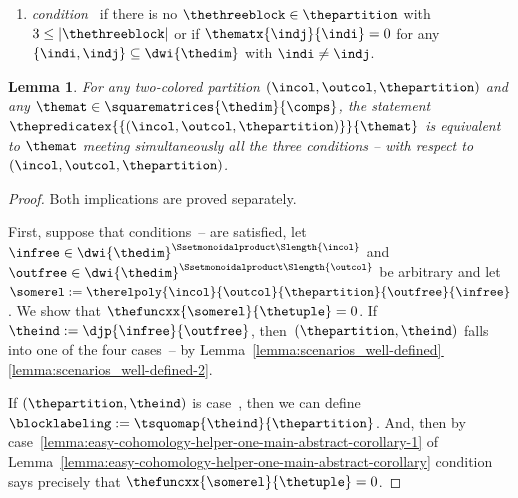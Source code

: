 \documentclass[pdftex]{sigma}
\numberwithin{equation}{section}
\newtheorem{Lemma}[Theorem]{Lemma}
\begin{document}
{\begin{Definition}
\begin{enumerate}
        \item \emph{condition~\conditionthree{}} if there is no $\thethreeblock\in\thepartition$ with $3\leq|\thethreeblock|$ or if $\thematx{\indj}{\indi}=0$ for any $\{\indi,\indj\}\subseteq \dwi{\thedim}$ with $\indi\neq \indj$.
    \end{enumerate}
  \end{Definition}
  \begin{Lemma}
    \label{lemma:scalar-article-main-lemma-corollary}
    For any two-colored partition $(\incol,\outcol,\thepartition)$  and any   $\themat\in\squarematrices{\thedim}{\comps}$, the statement    \linebreak $\thepredicatex{\{(\incol,\outcol,\thepartition)\}}{\themat}$ is equivalent to  $\themat$ meeting simultaneously all the three conditions \conditionone{}--\conditionthree{}  with respect to $(\incol,\outcol,\thepartition)$.
  \end{Lemma}

  \begin{proof}
    \newcommand{\thepoint}{\Yp{z}}
  \newcommand{\anypoint}{\Yp{y}}
  \newcommand{\thevalue}{s}
  \newcommand{\firstspecialpoint}{\Yp{z}_1}
  \newcommand{\secondspecialpoint}{\Yp{z}_2}
  Both implications are proved separately.

   First, suppose that  conditions~\conditionone{}--\conditionthree{} are satisfied, let  $\infree\in \dwi{\thedim}^{\Ssetmonoidalproduct\Slength{\incol}}$ and $\outfree\in\dwi{\thedim}^{\Ssetmonoidalproduct\Slength{\outcol}}$ be arbitrary and let $\somerel:= \therelpoly{\incol}{\outcol}{\thepartition}{\outfree}{\infree}$. We show that $\thefuncxx{\somerel}{\thetuple}=0$. If $\theind:=\djp{\infree}{\outfree}$, then~${(\thepartition,\theind)}$ falls into one of the four cases~\scenarioone{}--\scenariofour{} by Lem\-ma~\hyperref[lemma:scenarios_well-defined-2]{\ref*{lemma:scenarios_well-defined}\,\ref*{lemma:scenarios_well-defined-2}}.

If $(\thepartition,\theind)$ is case~\scenarioone{}, then we can define $\blocklabeling:=\tsquomap{\theind}{\thepartition}$. And,  then  by case~\ref{lemma:easy-cohomology-helper-one-main-abstract-corollary-1} of Lem\-ma~\ref{lemma:easy-cohomology-helper-one-main-abstract-corollary} con\-di\-tion~\conditionone{} says precisely that $\thefuncxx{\somerel}{\thetuple}=0$.


\end{proof}}
\end{document}
